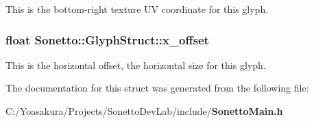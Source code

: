 This is the bottom-right texture UV coordinate for this glyph. 

\subsubsection{\setlength{\rightskip}{0pt plus 5cm}float {\bf Sonetto::GlyphStruct::x\_\-offset}}\label{struct_sonetto_1_1_glyph_struct_801838b064ea90827d3f36c0907b6500}


This is the horizontal offset, the horizontal size for this glyph. 



The documentation for this struct was generated from the following file:\begin{CompactItemize}
\item 
C:/Yoasakura/Projects/SonettoDevLab/include/{\bf SonettoMain.h}\end{CompactItemize}
